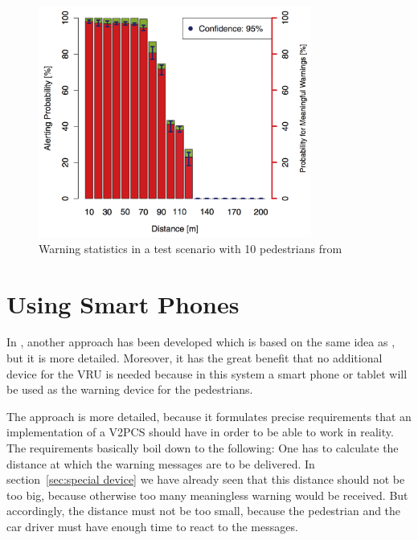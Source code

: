 \documentclass[]{ccs-thesis}
\begin{document}
\begin{figure}[h]
	\centering
	\includegraphics[width=0.8\textwidth]{figures/3_chart}
	\caption{Warning statistics in a test scenario with 10 pedestrians from \cite{v2pprotection}}%
	\label{fig:chart2}%
\end{figure}


\section{Using Smart Phones}\label{sec:smartphone}

In \cite{v2pcomm}, another approach has been developed which is based on the same idea as \cite{v2pprotection}, but it is more detailed. Moreover, it has the great benefit that no additional device for the \ac{VRU} is needed because in this system a smart phone or tablet will be used as the warning device for the pedestrians.

The approach is more detailed, because it formulates precise requirements that an implementation of a \ac{V2PCS} should have in order to be able to work in reality. The  requirements basically boil down to the following: One has to calculate the distance at which the warning messages are to be delivered. In section~\ref{sec:special device} we have already seen that this distance should not be too big, because otherwise too many meaningless warning would be received. But accordingly, the distance must not be too small, because the pedestrian and the car driver must have enough time to react to the messages.
\end{document}
